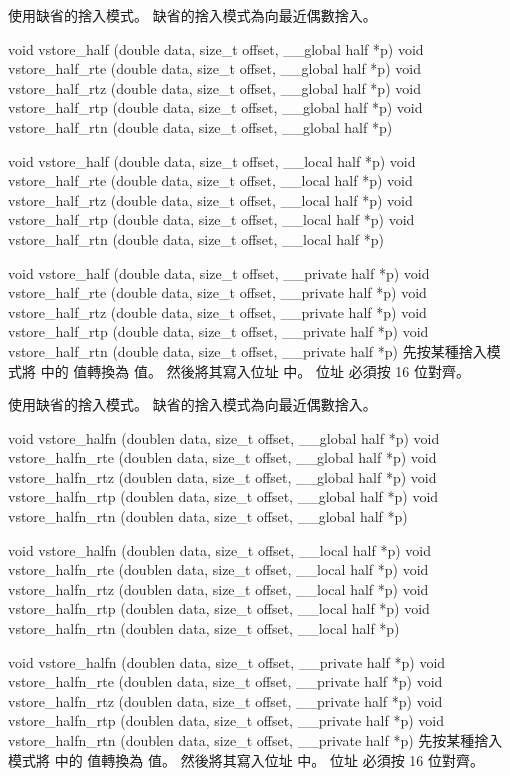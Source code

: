  使用缺省的捨入模式。
缺省的捨入模式為向最近偶數捨入。
\stopbuffer

void vstore_half (double data,
	size_t offset,
	__global half *p)
void vstore_half_rte (double data,
	size_t offset,
	__global half *p)
void vstore_half_rtz (double data,
	size_t offset,
	__global half *p)
void vstore_half_rtp (double data,
	size_t offset,
	__global half *p)
void vstore_half_rtn (double data,
	size_t offset,
	__global half *p)

void vstore_half (double data,
	size_t offset,
	__local half *p)
void vstore_half_rte (double data,
	size_t offset,
	__local half *p)
void vstore_half_rtz (double data,
	size_t offset,
	__local half *p)
void vstore_half_rtp (double data,
	size_t offset,
	__local half *p)
void vstore_half_rtn (double data,
	size_t offset,
	__local half *p)

void vstore_half (double data,
	size_t offset,
	__private half *p)
void vstore_half_rte (double data,
	size_t offset,
	__private half *p)
void vstore_half_rtz (double data,
	size_t offset,
	__private half *p)
void vstore_half_rtp (double data,
	size_t offset,
	__private half *p)
void vstore_half_rtn (double data,
	size_t offset,
	__private half *p)
\stopbuffer
{}
先按某種捨入模式將  中的  值轉換為  值。
然後將其寫入位址  中。
位址  必須按 16 位對齊。

 使用缺省的捨入模式。
缺省的捨入模式為向最近偶數捨入。
\stopbuffer

void vstore_halfn (doublen data,
	size_t offset,
	__global half *p)
void vstore_halfn_rte (doublen data,
	size_t offset,
	__global half *p)
void vstore_halfn_rtz (doublen data,
	size_t offset,
	__global half *p)
void vstore_halfn_rtp (doublen data,
	size_t offset,
	__global half *p)
void vstore_halfn_rtn (doublen data,
	size_t offset,
	__global half *p)

void vstore_halfn (doublen data,
	size_t offset,
	__local half *p)
void vstore_halfn_rte (doublen data,
	size_t offset,
	__local half *p)
void vstore_halfn_rtz (doublen data,
	size_t offset,
	__local half *p)
void vstore_halfn_rtp (doublen data,
	size_t offset,
	__local half *p)
void vstore_halfn_rtn (doublen data,
	size_t offset,
	__local half *p)

void vstore_halfn (doublen data,
	size_t offset,
	__private half *p)
void vstore_halfn_rte (doublen data,
	size_t offset,
	__private half *p)
void vstore_halfn_rtz (doublen data,
	size_t offset,
	__private half *p)
void vstore_halfn_rtp (doublen data,
	size_t offset,
	__private half *p)
void vstore_halfn_rtn (doublen data,
	size_t offset,
	__private half *p)
\stopbuffer
{}
先按某種捨入模式將  中的  值轉換為  值。
然後將其寫入位址  中。
位址  必須按 16 位對齊。

